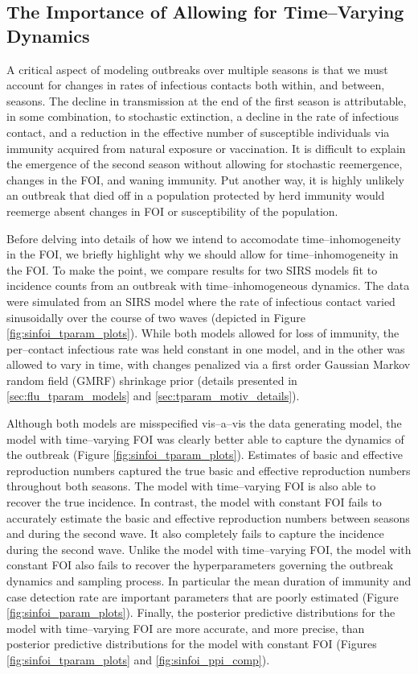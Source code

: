 \subsection{The Importance of Allowing for Time--Varying Dynamics}
\label{subsec:tparam_motivation}

A critical aspect of modeling outbreaks over multiple seasons is that we must account for changes in rates of infectious contacts both within, and between, seasons. The decline in transmission at the end of the first season is attributable, in some combination, to stochastic extinction, a decline in the rate of infectious contact, and a reduction in the effective number of susceptible individuals via immunity acquired from natural exposure or vaccination. It is difficult to explain the emergence of the second season without allowing for stochastic reemergence, changes in the FOI, and waning immunity. Put another way, it is highly unlikely an outbreak that died off in a population protected by herd immunity would reemerge absent changes in FOI or susceptibility of the population. 

Before delving into details of how we intend to accomodate time--inhomogeneity in the FOI, we briefly highlight why we should allow for time--inhomogeneity in the FOI. To make the point, we compare results for two SIRS models fit to incidence counts from an outbreak with time--inhomogeneous dynamics. The data were simulated from an SIRS model where the rate of infectious contact varied sinusoidally over the course of two waves (depicted in Figure \ref{fig:sinfoi_tparam_plots}). While both models allowed for loss of immunity, the per--contact infectious rate was held constant in one model, and in the other was allowed to vary in time, with changes penalized via a first order Gaussian Markov random field (GMRF) shrinkage prior (details presented in \ref{sec:flu_tparam_models} and \ref{sec:tparam_motiv_details}). 

Although both models are misspecified vis--a--vis the  data generating model, the model with time--varying FOI was clearly better able to capture the dynamics of the outbreak (Figure \ref{fig:sinfoi_tparam_plots}). Estimates of basic and effective reproduction numbers captured the true basic and effective reproduction numbers throughout both seasons. The model with time--varying FOI is also able to recover the true incidence. In contrast, the model with constant FOI fails to accurately estimate the basic and effective reproduction numbers between seasons and during the second wave. It also completely fails to capture the incidence during the second wave. Unlike the model with time--varying FOI, the model with constant FOI also fails to recover the hyperparameters governing the outbreak dynamics and sampling process. In particular the mean duration of immunity and case detection rate are important parameters that are poorly estimated (Figure \ref{fig:sinfoi_param_plots}). Finally, the posterior predictive distributions for the model with time--varying FOI are more accurate, and more precise, than posterior predictive distributions for the model with constant FOI (Figures \ref{fig:sinfoi_tparam_plots} and \ref{fig:sinfoi_ppi_comp}).

